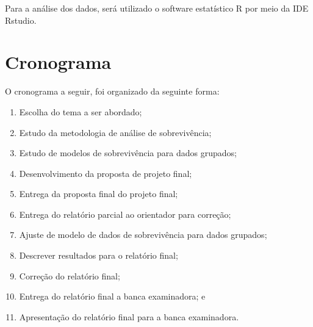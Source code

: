 Para a análise dos dados, será utilizado o software estatístico R por meio da IDE Rstudio.

\section*{Cronograma}

O cronograma a seguir, foi organizado da seguinte forma:

\begin{enumerate}
	\item Escolha do tema a ser abordado;
	\item Estudo da metodologia de análise de sobrevivência;
	\item Estudo de modelos de sobrevivência para dados grupados;
	\item Desenvolvimento da proposta de projeto final;	
	\item Entrega da proposta final do projeto final;
	\item Entrega do relatório parcial ao orientador para correção;
	\item Ajuste de modelo de dados de sobrevivência para dados grupados;
	\item Descrever resultados para o relatório final;
	\item Correção do relatório final;
	\item Entrega do relatório final a banca examinadora; e
	\item Apresentação do relatório final para a banca examinadora.
\end{enumerate}
		
